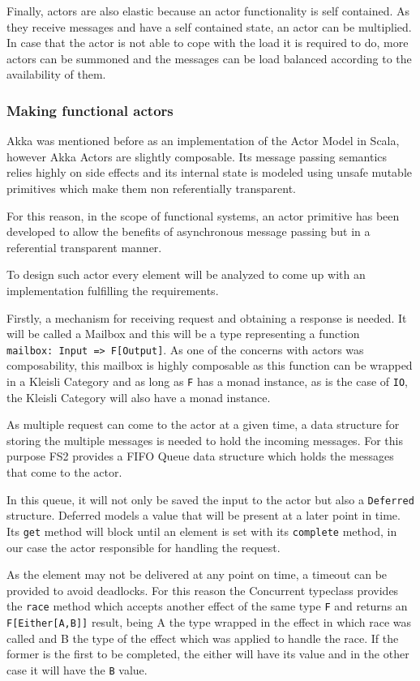 \documentclass[../main.tex]{subfiles}
\begin{document}
Finally, actors are also elastic because an actor functionality is self
contained. As they receive messages and have a self contained state, an actor can be
multiplied. In case that the actor is not able to cope with the load it is
required to do, more actors can be summoned and the messages can be load balanced
according to the availability of them.

\subsubsection{Making functional actors}
Akka was mentioned before as an implementation of the Actor Model in Scala,
however Akka Actors are slightly composable. Its message passing semantics relies
highly on side effects and its internal state is modeled using unsafe mutable
primitives which make them non referentially transparent.

For this reason, in the scope of functional systems, an actor primitive has been
developed to allow the benefits of asynchronous message passing but in a
referential transparent manner.

To design such actor every element will be analyzed to come up with
an implementation fulfilling the requirements.

Firstly, a mechanism for receiving request and obtaining a
response is needed. It will be called a Mailbox and this will be a type representing a function \\
\lstinline{mailbox: Input => F[Output]}. As one of the concerns with actors was
composability, this mailbox is highly composable as this function can be wrapped
in a Kleisli Category and as long as \texttt{F} has a monad instance, as is the case of
\texttt{IO}, the Kleisli Category will also have a monad instance.

As multiple request can come to the actor at a given time, a data structure for
storing the multiple messages is needed to hold the incoming messages. For this
purpose FS2 provides a FIFO Queue data structure which holds the messages that
come to the actor.

In this queue, it will not only be saved the input to the actor but also a
\texttt{Deferred} structure. Deferred models a value that will be present at a
later point in time. Its \texttt{get} method will block until an element is set
with its \texttt{complete} method, in our case the actor responsible for
handling the request.

As the element may not be delivered at any point on time,
a timeout can be provided to avoid deadlocks. For this reason the Concurrent
typeclass provides the \texttt{race} method which accepts another effect of the same type
\texttt{F} and returns an \texttt{F[Either[A,B]]} result, being A the type
wrapped in the effect in which race was called and B the type of the effect
which was applied to handle the race. If the former is the first to be completed, the
either will have its value and in the other case it will have the \texttt{B}
value.
\end{document}
